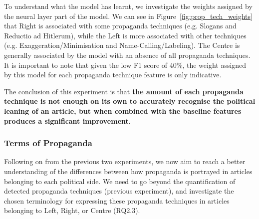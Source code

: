 To understand what the model has learnt, we investigate the weights assigned by the neural layer part of the model. We can see in Figure~\ref{fig:prop_tech_weights} that Right is associated with some propaganda techniques (e.g. Slogans and Reductio ad Hitlerum), while the Left is more associated with other techniques (e.g. Exaggeration/Minimisation and Name-Calling/Labeling).
The Centre is generally associated by the model with an absence of all  propaganda techniques. It is important to note that given the low F1 score of 40\%, the weight assigned by this model for each propaganda technique feature is only indicative. %




The conclusion of this experiment is that \textbf{the amount of each propaganda technique is not enough on its own to accurately recognise the political leaning of an article, but when combined with the baseline features produces a significant improvement}.


\subsubsection{Terms of Propaganda}

Following on from the previous two experiments, we now aim to reach a better understanding of the differences between how propaganda is portrayed in articles belonging to each political side.
We need to go beyond the quantification of detected propaganda techniques (previous experiment), and investigate the chosen terminology for expressing these propaganda techniques in articles belonging to Left, Right, or Centre (RQ2.3). %

